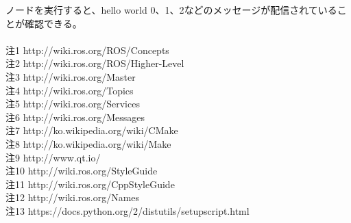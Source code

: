 ノードを実行すると、hello world 0、1、2などのメッセージが配信されていることが確認できる。\\
\\
注1  http://wiki.ros.org/ROS/Concepts\\
注2  http://wiki.ros.org/ROS/Higher-Level\\%
注3  http://wiki.ros.org/Master\\
注4  http://wiki.ros.org/Topics\\
注5  http://wiki.ros.org/Services\\
注6  http://wiki.ros.org/Messages\\
注7  http://ko.wikipedia.org/wiki/CMake\\
注8  http://ko.wikipedia.org/wiki/Make\\
注9  http://www.qt.io/\\
注10 http://wiki.ros.org/StyleGuide\\
注11 http://wiki.ros.org/CppStyleGuide\\
注12 http://wiki.ros.org/Names\\
注13 https://docs.python.org/2/distutils/setupscript.html\\

